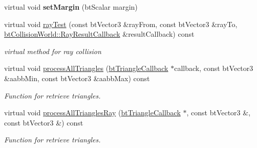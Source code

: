 \begin{DoxyCompactItemize}
\item 
\hypertarget{classbt_g_impact_shape_interface_a2732455f7b2cdb44c41481d9d9ebd548}{virtual void {\bfseries set\+Margin} (bt\+Scalar margin)}\label{classbt_g_impact_shape_interface_a2732455f7b2cdb44c41481d9d9ebd548}

\item 
\hypertarget{classbt_g_impact_shape_interface_a87aac603f1fcd40f3c1cfe0d6f8baf16}{virtual void \hyperlink{classbt_g_impact_shape_interface_a87aac603f1fcd40f3c1cfe0d6f8baf16}{ray\+Test} (const bt\+Vector3 \&ray\+From, const bt\+Vector3 \&ray\+To, \hyperlink{structbt_collision_world_1_1_ray_result_callback}{bt\+Collision\+World\+::\+Ray\+Result\+Callback} \&result\+Callback) const }\label{classbt_g_impact_shape_interface_a87aac603f1fcd40f3c1cfe0d6f8baf16}

\begin{DoxyCompactList}\small\item\em virtual method for ray collision \end{DoxyCompactList}\item 
virtual void \hyperlink{classbt_g_impact_shape_interface_a2faf9adce39854a9a66dd658f646be25}{process\+All\+Triangles} (\hyperlink{classbt_triangle_callback}{bt\+Triangle\+Callback} $\ast$callback, const bt\+Vector3 \&aabb\+Min, const bt\+Vector3 \&aabb\+Max) const 
\begin{DoxyCompactList}\small\item\em Function for retrieve triangles. \end{DoxyCompactList}\item 
virtual void \hyperlink{classbt_g_impact_shape_interface_a646ad13b4aa116d58df110c2f407e5a8}{process\+All\+Triangles\+Ray} (\hyperlink{classbt_triangle_callback}{bt\+Triangle\+Callback} $\ast$, const bt\+Vector3 \&, const bt\+Vector3 \&) const 
\begin{DoxyCompactList}\small\item\em Function for retrieve triangles. \end{DoxyCompactList}\end{DoxyCompactItemize}
{\bf }\par

